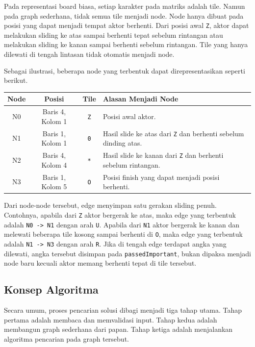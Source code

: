 \documentclass[a4paper,11pt]{article}
\begin{document}
Pada representasi board biasa, setiap karakter pada matriks adalah tile. Namun pada graph sederhana, tidak semua tile menjadi node. Node hanya dibuat pada posisi yang dapat menjadi tempat aktor berhenti. Dari posisi awal \texttt{Z}, aktor dapat melakukan sliding ke atas sampai berhenti tepat sebelum rintangan atau melakukan sliding ke kanan sampai berhenti sebelum rintangan. Tile yang hanya dilewati di tengah lintasan tidak otomatis menjadi node.

Sebagai ilustrasi, beberapa node yang terbentuk dapat direpresentasikan seperti berikut.

\begin{longtable}{|c|c|c|p{6cm}|}
    \hline
    \textbf{Node} & \textbf{Posisi} & \textbf{Tile} & \textbf{Alasan Menjadi Node} \\
    \hline
    \endhead
    N0 & Baris 4, Kolom 1 & \texttt{Z} & Posisi awal aktor. \\
    \hline
    N1 & Baris 1, Kolom 1 & \texttt{0} & Hasil slide ke atas dari \texttt{Z} dan berhenti sebelum dinding atas. \\
    \hline
    N2 & Baris 4, Kolom 4 & \texttt{*} & Hasil slide ke kanan dari \texttt{Z} dan berhenti sebelum rintangan. \\
    \hline
    N3 & Baris 1, Kolom 5 & \texttt{O} & Posisi finish yang dapat menjadi posisi berhenti. \\
    \hline
\end{longtable}

Dari node-node tersebut, edge menyimpan satu gerakan sliding penuh. Contohnya, apabila dari \texttt{Z} aktor bergerak ke atas, maka edge yang terbentuk adalah \texttt{N0 -> N1} dengan arah \texttt{U}. Apabila dari \texttt{N1} aktor bergerak ke kanan dan melewati beberapa tile kosong sampai berhenti di \texttt{O}, maka edge yang terbentuk adalah \texttt{N1 -> N3} dengan arah \texttt{R}. Jika di tengah edge terdapat angka yang dilewati, angka tersebut disimpan pada \texttt{passedImportant}, bukan dipaksa menjadi node baru kecuali aktor memang berhenti tepat di tile tersebut.

\subsection{Konsep Algoritma}
Secara umum, proses pencarian solusi dibagi menjadi tiga tahap utama. Tahap pertama adalah membaca dan memvalidasi input. Tahap kedua adalah membangun graph sederhana dari papan. Tahap ketiga adalah menjalankan algoritma pencarian pada graph tersebut.
\end{document}
